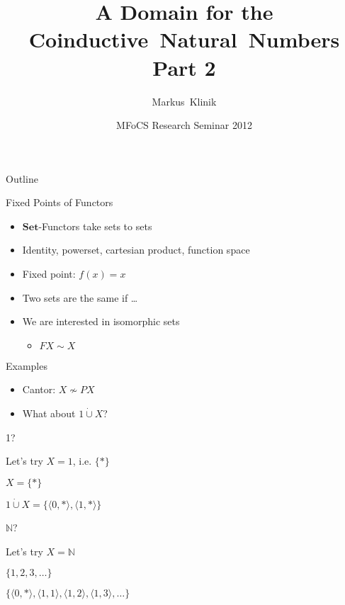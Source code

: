 \documentclass{beamer}
\title
{A Domain for the\\
Coinductive~Natural~Numbers\\
Part 2}
\author
{Markus~Klinik}
\institute[Radboud University Nijmegen] %
{
  Radboud University Nijmegen
}
\date
{MFoCS Research Seminar 2012}
\begin{document}
\begin{frame}
  \titlepage
\end{frame}

\begin{frame}{Outline}
  \tableofcontents
\end{frame}

\begin{frame}{Fixed Points of Functors}

\begin{itemize}%
  \item $\mathbf{Set}$-Functors take sets to sets
  \item Identity, powerset, cartesian product, function space
  \item Fixed point: $f(x) = x$
  \item Two sets are the same if \ldots
  \item We are interested in isomorphic sets
    \begin{itemize}
      \item $FX \sim X$
    \end{itemize}
\end{itemize}

\end{frame}


\begin{frame}{Examples}

\begin{itemize}
  \item Cantor: $X \nsim PX$
  \item What about $1 \dot\cup X$?
\end{itemize}

\end{frame}


\begin{frame}{1?}

Let's try $X = 1$, i.e. $\{*\}$

\begin{center}

$X = \{*\}$

\bigskip

$1 \dot\cup X = \{\langle 0, * \rangle, \langle 1, * \rangle\}$

\end{center}

\end{frame}


\begin{frame}{$\mathbb{N}$?}

Let's try $X = \mathbb{N}$

\begin{center}

$\{1, 2, 3, \ldots \}$

\bigskip

$\{\langle 0, * \rangle
, \langle 1, 1 \rangle
, \langle 1, 2 \rangle
, \langle 1, 3 \rangle
, \ldots
\}$

\end{center}

\end{frame}
\end{document}
